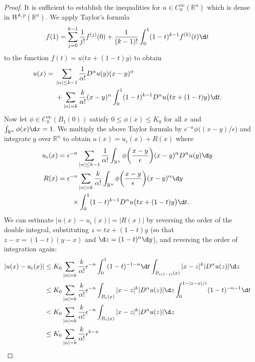\begin{proof}
  It is sufficient to establish the inequalities for $u\in C_0^\infty(\mathbb{R}^n)$
  which is dense in $W^{k,p}(\mathbb{R}^n)$. We apply Taylor's formula
  \[ f(1) = \sum_{j=0}^{k-1} \frac{1}{j!} f^{(j)}(0)
      + \frac{1}{(k-1)!} \int_0^1 (1-t)^{k-1} f^{(k)}(t) \d t \]
  to the function $f(t) = u\bigl(tx+(1-t)y\bigr)$ to obtain
  \begin{align*}
    u(x) ={}
    & \sum_{|\alpha|\leq k-1} \frac{1}{\alpha!} D^\alpha u(y) (x-y)^\alpha \\
    & + \sum_{|\alpha|=k} \frac{k}{\alpha!} (x-y)^\alpha
        \int_0^1 (1-t)^{k-1} D^\alpha u\bigl(tx+(1-t)y\bigr) \d t.
  \end{align*}
  Now let $\phi\in C_0^\infty(B_1(0))$ satisfy $0\leq\phi(x)\leq K_0$
  for all $x$ and $\int_{\mathbb{R}^n} \phi(x) \d x=1$. We multiply
  the above Taylor formula by $\epsilon^{-n} \phi\bigl((x-y)/\epsilon\bigr)$
  and integrate $y$ over $\mathbb{R}^n$ to obtain $u(x) = u_{\epsilon}(x) + R(x)$
  where
  \begin{align*}
    u_{\epsilon}(x)
    & = \epsilon^{-n} \sum_{|\alpha|\leq k-1} \frac{1}{\alpha!}
        \int_{\mathbb{R}^n} \phi\biggl(\frac{x-y}{\epsilon}\biggr) (x-y)^\alpha
          D^\alpha u(y) \d y \\
    R(x)
    & = \epsilon^{-n} \sum_{|\alpha|=k} \frac{k}{\alpha!}
        \int_{\mathbb{R}^n} \phi\biggl(\frac{x-y}{\epsilon}\biggr) (x-y)^\alpha \d y \\
    &   \qquad \times \int_0^1 (1-t)^{k-1} D^\alpha u\bigl(tx+(1-t)y\bigr) \d t.
  \end{align*}
  We can estimate $|u(x)-u_{\epsilon}(x)| = |R(x)|$ by reversing the order
  of the double integral, substituting $z = tx+(1-t)y$ (so that $z-x = (1-t)(y-x)$
  and $\d z = (1-t)^n \d y$), and reversing the order of integration again:
  \begin{align*}
    |u(x) - u_{\epsilon}(x)|
    & \leq K_0 \sum_{|\alpha|=k} \frac{k}{\alpha!} \epsilon^{-n}
        \int_0^1 (1-t)^{-1-n} \d t \int_{B_{\epsilon(1-t)}(x)} |x-z|^k |D^\alpha u(z)| \d z \\
    & \leq K_0 \sum_{|\alpha|=k} \frac{k}{\alpha!} \epsilon^{-n}
        \int_{B_{\epsilon}(x)} |x-z|^k |D^\alpha u(z)| \d z
        \int_0^{1-|z-x|/\epsilon} (1-t)^{-n-1} \d t \\
    & < K_0 \sum_{|\alpha|=k} \frac{k}{\alpha!} \epsilon^{-n}
        \int_{B_{\epsilon}(x)} |x-z|^k |D^\alpha u(z)| \d z \\
    & \leq K_0 \sum_{|\alpha|=k} \frac{k}{\alpha!} \epsilon^{k-n}

\end{align*}
\end{proof}
